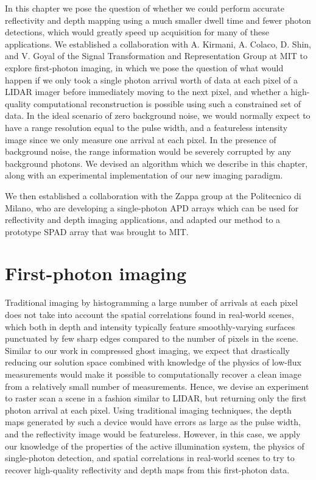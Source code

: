 In this chapter we pose the question of whether we could perform accurate reflectivity and depth mapping using a much smaller dwell time and fewer photon detections, which would greatly speed up acquisition for many of these applications. We established a collaboration with A. Kirmani, A. Colaco, D. Shin, and V. Goyal of the Signal Transformation and Representation Group at MIT to explore first-photon imaging, in which we pose the question of what would happen if we only took a single photon arrival worth of data at each pixel of a LIDAR imager before immediately moving to the next pixel, and whether a high-quality computational reconstruction is possible using such a constrained set of data. In the ideal scenario of zero background noise, we would normally expect to have a range resolution equal to the pulse width, and a featureless intensity image since we only measure one arrival at each pixel. In the presence of background noise, the range information would be severely corrupted by any background photons. We devised an algorithm which we describe in this chapter, along with an experimental implementation of our new imaging paradigm.

We then established a collaboration with the Zappa group at the Politecnico di Milano, who are developing a single-photon APD arrays \cite{villa-spad,guerrieri-two,scarcella-low} which can be used for reflectivity and depth imaging applications, and adapted our method to a prototype SPAD array that was brought to MIT.

\section{First-photon imaging}

Traditional imaging by histogramming a large number of arrivals at each pixel does not take into account the spatial correlations found in real-world scenes, which both in depth and intensity typically feature smoothly-varying surfaces punctuated by few sharp edges compared to the number of pixels in the scene. Similar to our work in compressed ghost imaging, we expect that drastically reducing our solution space combined with knowledge of the physics of low-flux measurements would make it possible to computationally recover a clean image from a relatively small number of measurements. Hence, we devise an experiment  to raster scan a scene in a fashion similar to LIDAR, but returning only the first photon arrival at each pixel. Using traditional imaging techniques, the depth maps generated by such a device would have errors as large as the pulse width, and the reflectivity image would be featureless. However, in this case, we apply our knowledge of the properties of the active illumination system, the physics of single-photon detection, and spatial correlations in real-world scenes to try to recover high-quality reflectivity and depth maps from this first-photon data.

